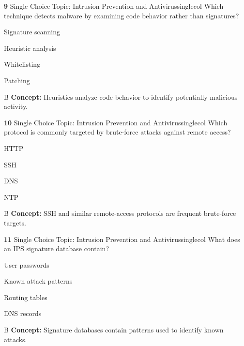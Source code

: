 \documentclass[10pt,a4paper]{article}
\begin{document}
\begin{qcard}{\color{white}\textbf{9} \hfill \small Single Choice \textbar{} Topic: Intrusion Prevention and Antivirus}{singlecol}
Which technique detects malware by examining code behavior rather than signatures?

\begin{qoptions}
\item Signature scanning
\item Heuristic analysis
\item Whitelisting
\item Patching
\end{qoptions}
\begin{explainbox}{B}
\textbf{Concept:} Heuristics analyze code behavior to identify potentially malicious activity.
\end{explainbox}
\end{qcard}

\begin{qcard}{\color{white}\textbf{10} \hfill \small Single Choice \textbar{} Topic: Intrusion Prevention and Antivirus}{singlecol}
Which protocol is commonly targeted by brute-force attacks against remote access?

\begin{qoptions}
\item HTTP
\item SSH
\item DNS
\item NTP
\end{qoptions}
\begin{explainbox}{B}
\textbf{Concept:} SSH and similar remote-access protocols are frequent brute-force targets.
\end{explainbox}
\end{qcard}

\begin{qcard}{\color{white}\textbf{11} \hfill \small Single Choice \textbar{} Topic: Intrusion Prevention and Antivirus}{singlecol}
What does an IPS signature database contain?

\begin{qoptions}
\item User passwords
\item Known attack patterns
\item Routing tables
\item DNS records
\end{qoptions}
\begin{explainbox}{B}
\textbf{Concept:} Signature databases contain patterns used to identify known attacks.
\end{explainbox}
\end{qcard}
\end{document}
